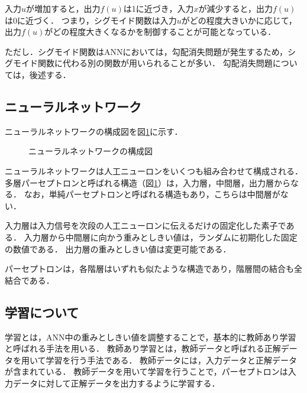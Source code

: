 \documentclass[a4j,12pt,dvipdfmx]{jreport}
\begin{document}
入力$u$が増加すると，出力$f(u)$は1に近づき，入力$x$が減少すると，出力$f(u)$は0に近づく．
つまり，シグモイド関数は入力$u$がどの程度大きいかに応じて，出力$f(u)$がどの程度大きくなるかを制御することが可能となっている．

ただし．シグモイド関数はANNにおいては，勾配消失問題が発生するため，シグモイド関数に代わる別の関数が用いられることが多い．
勾配消失問題については，後述する．

\subsection{ニューラルネットワーク}
ニューラルネットワークの構成図を図\ref{fig:perceptron}に示す．

\begin{figure}[t]
  \centering
  \caption{ニューラルネットワークの構成図}
  \label{fig:perceptron}
\end{figure}
ニューラルネットワークは人工ニューロンをいくつも組み合わせて構成される\cite{ms_tamura}．
多層パーセプトロンと呼ばれる構造（図\ref{fig:perceptron}）は，入力層，中間層，出力層からなる．
なお，単純パーセプトロンと呼ばれる構造もあり，こちらは中間層がない．

入力層は入力信号を次段の人工ニューロンに伝えるだけの固定化した素子である．
入力層から中間層に向かう重みとしきい値は，ランダムに初期化した固定の数値である．
出力層の重みとしきい値は変更可能である．

パーセプトロンは，各階層はいずれも似たような構造であり，階層間の結合も全結合である．


\subsection{学習について}
学習とは，ANN中の重みとしきい値を調整することで，基本的に教師あり学習と呼ばれる手法を用いる\cite{G}．
教師あり学習とは，教師データと呼ばれる正解データを用いて学習を行う手法である．
教師データには，入力データと正解データが含まれている．
教師データを用いて学習を行うことで，パーセプトロンは入力データに対して正解データを出力するように学習する．
\end{document}
